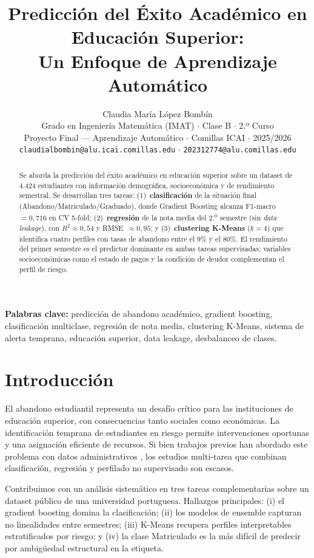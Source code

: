 \documentclass{article}
\title{Predicci\'on del \'Exito Acad\'emico en Educaci\'on Superior:\\Un Enfoque de Aprendizaje Autom\'atico}
\author{%
  Claudia Mar\'ia L\'opez Bomb\'in \\
  Grado en Ingenier\'ia Matem\'atica (IMAT) $\cdot$ Clase B $\cdot$ 2.º Curso \\
  Proyecto Final --- Aprendizaje Autom\'atico $\cdot$ Comillas ICAI $\cdot$ 2025/2026 \\
  \texttt{claudialbombin@alu.icai.comillas.edu} $\cdot$ \texttt{202312774@alu.comillas.edu}
}
\begin{document}
\maketitle

\begin{abstract}
Se aborda la predicci\'on del \'exito acad\'emico en educaci\'on superior sobre un dataset de 4.424 estudiantes con informaci\'on demogr\'afica, socioecon\'omica y de rendimiento semestral. Se desarrollan tres tareas: (1)~\textbf{clasificaci\'on} de la situaci\'on final (Abandono/Matriculado/Graduado), donde Gradient Boosting alcanza F1-macro~$= 0{,}716$ en CV 5-fold; (2)~\textbf{regresi\'on} de la nota media del 2.\textsuperscript{o} semestre (sin \textit{data leakage}), con $R^2 \approx 0{,}54$ y RMSE~$\approx 0{,}95$; y (3)~\textbf{clustering K-Means} ($k=4$) que identifica cuatro perfiles con tasas de abandono entre el 9\% y el 80\%. El rendimiento del primer semestre es el predictor dominante en ambas tareas supervisadas; variables socioecon\'omicas como el estado de pagos y la condici\'on de deudor complementan el perfil de riesgo.
\end{abstract}

\vspace{0.5em}
\noindent\textbf{Palabras clave:} predicci\'on de abandono acad\'emico, gradient boosting, clasificaci\'on multiclase, regresi\'on de nota media, clustering K-Means, sistema de alerta temprana, educaci\'on superior, data leakage, desbalanceo de clases.

\section{Introducci\'on}

El abandono estudiantil representa un desaf\'io cr\'itico para las instituciones de educaci\'on superior, con consecuencias tanto sociales como econ\'omicas. La identificaci\'on temprana de estudiantes en riesgo permite intervenciones oportunas y una asignaci\'on eficiente de recursos. Si bien trabajos previos han abordado este problema con datos administrativos \cite{realinho2022}, los estudios multi-tarea que combinan clasificaci\'on, regresi\'on y perfilado no supervisado son escasos.

Contribuimos con un an\'alisis sistem\'atico en tres tareas complementarias sobre un dataset p\'ublico de una universidad portuguesa. Hallazgos principales: (i) el gradient boosting domina la clasificaci\'on; (ii) los modelos de ensemble capturan no linealidades entre semestres; (iii) K-Means recupera perfiles interpretables estratificados por riesgo; y (iv) la clase Matriculado es la m\'as dif\'icil de predecir por ambig\"uedad estructural en la etiqueta.
\end{document}
